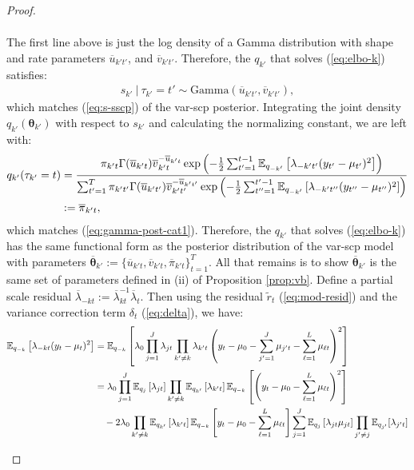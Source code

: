 \begin{proof}
\begin{enumerate}[label=\roman*.]
\begin{align*}
\end{align*}
The first line above is just the log density of a Gamma distribution with shape and rate parameters $\overline{u}_{k't'}$, and $\overline{v}_{k't'}$. Therefore, the $q_{k'}$ that solves (\ref{eq:elbo-k}) satisfies:
\begin{align*}
    s_{k'} \:|\: \tau_{k'} = t' \sim \text{Gamma}(\overline{u}_{k't'}, \overline{v}_{k't'}),
\end{align*}
which matches (\ref{eq:s-sscp}) of the var-scp posterior. Integrating the joint density $q_{k'}(\boldsymbol{\theta}_{k'})$ with respect to $s_{k'}$ and calculating the normalizing constant, we are left with: 
\begin{align*}
    q_{k'}(\tau_{k'} = t) &= \frac{\pi_{k't}\Gamma(\overline{u}_{k't})\overline{v}_{k't}^{-\overline{u}_{k't}}\exp\left( -\frac{1}{2} \sum_{t'=1}^{t-1} \mathbb{E}_{q_{-k'}}\left[\lambda_{-k't'}(y_{t'} - \mu_{t'})^2\right] \right)}{\sum_{t'=1}^T \pi_{k't'}\Gamma(\overline{u}_{k't'})\overline{v}_{k't'}^{-\overline{u}_{k't'}}\exp\left( -\frac{1}{2} \sum_{t''=1}^{t'-1} \mathbb{E}_{q_{-k'}}\left[\lambda_{-k't''}(y_{t''} - \mu_{t''})^2\right] \right)} \\
    &:= \overline{\pi}_{k't}, 
\end{align*}
which matches (\ref{eq:gamma-post-cat1}). Therefore, the $q_{k'}$ that solves (\ref{eq:elbo-k}) has the same functional form as the posterior distribution of the var-scp model with parameters $\overline{\boldsymbol{\theta}}_{k'} := \{\overline{u}_{k't},\overline{v}_{k't},\overline{\pi}_{k't}\}_{t=1}^T$. All that remains is to show $\overline{\boldsymbol{\theta}}_{k'}$ is the same set of parameters defined in (ii) of Proposition \ref{prop:vb}. Define a partial scale residual $\overline{\lambda}_{-k t} := \overline{\lambda}_{kt}^{-1}\overline{\lambda}_t$. Then using the residual $\tilde{r}_t$ (\ref{eq:mod-resid}) and the variance correction term $\delta_t$ (\ref{eq:delta}), we have:
\footnotesize
\begin{align*}
    \E_{q_{-k}}\left[\lambda_{-kt}(y_t - \mu_t)^2\right] &= \E_{q_{-k}}\left[\lambda_0\prod_{j =1}^J\lambda_{jt} \prod_{k' \neq k} \lambda_{k't}\left(y_t - \mu_0 - \sum_{j'=1}^J \mu_{j't} - \sum_{\ell=1}^L \mu_{\ell t}\right)^2\right] \\
    &= \lambda_0\prod_{j =1}^J\E_{q_{j}}\left[\lambda_{jt}\right] \prod_{k'\neq k} \E_{q_{k'}}\left[\lambda_{k't}\right]\E_{q_{-k}}\left[\left(y_t - \mu_0 - \sum_{\ell=1}^L \mu_{\ell t}\right)^2\right] \\
    &\quad -2 \lambda_0 \prod_{k'\neq k} \E_{q_{k'}}\left[\lambda_{k't}\right]\E_{q_{-k}}\left[y_t - \mu_0  - \sum_{\ell=1}^L \mu_{\ell t}\right] \sum_{j=1}^J \E_{q_{j}}\left[\lambda_{jt} \mu_{jt}\right]\prod_{j' \neq j}\E_{q_{j'}}[\lambda_{j't}]  \\

\end{align*}
\end{enumerate}
\end{proof}
